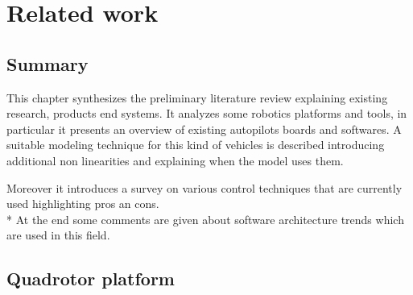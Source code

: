 

\chapter{Related work}
\label{chap:second}
\ifpdf
    \graphicspath{{Chapter2/Figures/PNG/}{Chapter2/Figures/PDF/}{Chapter2/Figures/}}
\else
    \graphicspath{{Chapter2/Figures/EPS/}{Chapter2/Figures/}}
\fi

\section*{Summary}
This chapter synthesizes the preliminary literature review explaining existing research, products end systems. It analyzes some robotics platforms and tools, in particular it presents an overview of existing autopilots boards and softwares. A suitable modeling technique for this kind of vehicles is described introducing additional non linearities and explaining when the model uses them.

Moreover it introduces a survey on various control techniques that are currently used highlighting pros an cons. \\*
At the end some comments are given about software architecture trends which are used in this field. 

\section{Quadrotor platform}


